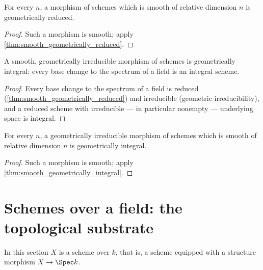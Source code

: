 \begin{lemma}
  \label{lem:relDim_geometrically_reduced}
  \leanok
  For every \(n\), a morphism of schemes which is smooth of relative dimension \(n\) is
  geometrically reduced.
\end{lemma}
\begin{proof}
  \leanok
  Such a morphism is smooth; apply \ref{thm:smooth_geometrically_reduced}.
\end{proof}

\begin{theorem}
  \label{thm:smooth_geometrically_integral}
  \leanok
  A smooth, geometrically irreducible morphism of schemes is geometrically integral: every
  base change to the spectrum of a field is an integral scheme.
\end{theorem}
\begin{proof}
  \leanok
  Every base change to the spectrum of a field is reduced
  (\ref{thm:smooth_geometrically_reduced}) and irreducible (geometric irreducibility), and a
  reduced scheme with irreducible --- in particular nonempty --- underlying space is integral.
\end{proof}

\begin{theorem}
  \label{thm:relDim_geometrically_integral}
  \leanok
  For every \(n\), a geometrically irreducible morphism of schemes which is smooth of relative
  dimension \(n\) is geometrically integral.
\end{theorem}
\begin{proof}
  \leanok
  Such a morphism is smooth; apply \ref{thm:smooth_geometrically_integral}.
\end{proof}

\section{Schemes over a field: the topological substrate}

In this section \(X\) is a scheme over \(k\), that is, a scheme equipped with a structure
morphism \(X \to \Spec k\).

